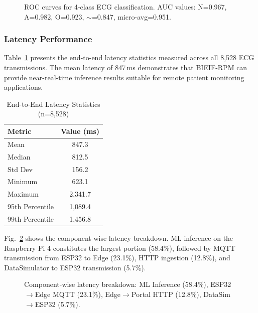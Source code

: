 \begin{figure}[htbp]
\centering
\caption{ROC curves for 4-class ECG classification. AUC values: N=0.967, A=0.982, O=0.923, $\sim$=0.847, micro-avg=0.951.}
\label{fig:roc}
\end{figure}

\subsubsection{Latency Performance}

Table~\ref{tab:latency} presents the end-to-end latency statistics measured across all 8,528 ECG transmissions. The mean latency of 847\,ms demonstrates that BIEIF-RPM can provide near-real-time inference results suitable for remote patient monitoring applications.

\begin{table}[htbp]
\centering
\caption{End-to-End Latency Statistics (n=8,528)}
\label{tab:latency}
\begin{tabular}{@{}lc@{}}
\toprule
\textbf{Metric} & \textbf{Value (ms)} \\
\midrule
Mean & 847.3 \\
Median & 812.5 \\
Std Dev & 156.2 \\
Minimum & 623.1 \\
Maximum & 2,341.7 \\
95th Percentile & 1,089.4 \\
99th Percentile & 1,456.8 \\
\bottomrule
\end{tabular}
\end{table}

Fig.~\ref{fig:latency_breakdown} shows the component-wise latency breakdown. ML inference on the Raspberry Pi 4 constitutes the largest portion (58.4\%), followed by MQTT transmission from ESP32 to Edge (23.1\%), HTTP ingestion (12.8\%), and DataSimulator to ESP32 transmission (5.7\%).

\begin{figure}[htbp]
\centering
\caption{Component-wise latency breakdown: ML Inference (58.4\%), ESP32$\rightarrow$Edge MQTT (23.1\%), Edge$\rightarrow$Portal HTTP (12.8\%), DataSim$\rightarrow$ESP32 (5.7\%).}
\label{fig:latency_breakdown}
\end{figure}


